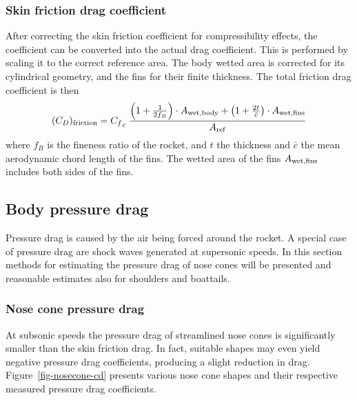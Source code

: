 \subsubsection{Skin friction drag coefficient}
\label{sec-skin-friction-drag}

After correcting the skin friction coefficient for compressibility
effects, the coefficient can be converted into the actual drag
coefficient.  This is performed by scaling it to the correct reference
area.  The body wetted area is corrected for its cylindrical geometry,
and the fins for their finite thickness.
The total friction drag coefficient is then
%
\begin{equation}
(C_D)_{\rm friction} = {C_f}_c \; \frac{
  \del{1 + \frac{1}{2f_B}} \cdot A_{\rm wet,body} + 
  \del{1 + \frac{2t}{\bar c}} \cdot A_{\rm wet,fins}}
   {\Aref}
\label{eq-friction-drag-scale}
\end{equation}
%
where $f_B$ is the fineness ratio of the rocket, and $t$ the thickness
and $\bar c$ the mean aerodynamic chord length of the fins.  The
wetted area of the fins $A_{\rm wet,fins}$ includes both sides of the
fins.





\subsection{Body pressure drag}

Pressure drag is caused by the air being forced around the rocket.  A
special case of pressure drag are shock waves generated at supersonic
speeds.  In this section methods for estimating the pressure drag of
nose cones will be presented and reasonable estimates also for
shoulders and boattails.


\subsubsection{Nose cone pressure drag}

At subsonic speeds the pressure drag of streamlined nose cones is
significantly smaller than the skin friction drag.  In fact, suitable
shapes may even yield negative pressure drag coefficients, producing a
slight reduction in drag.  Figure~\ref{fig-nosecone-cd} presents
various nose cone shapes and their respective measured pressure drag
coefficients.~\cite[p.~3-12]{hoerner}

